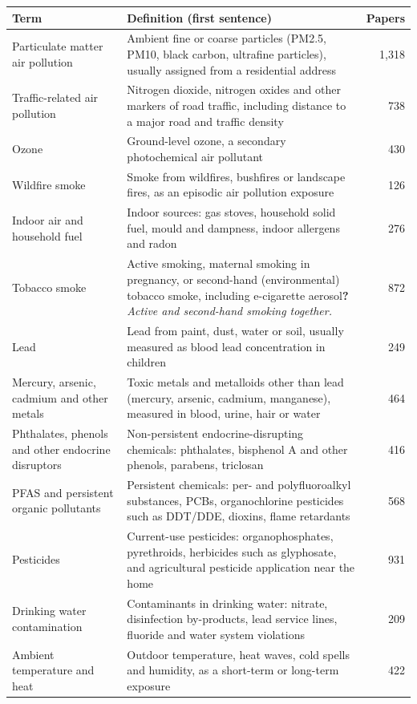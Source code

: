 \documentclass[10pt]{article}
\begin{document}
\begin{longtable}{@{}P{3.6cm}P{9.4cm}r@{}}\toprule Term & Definition (first sentence) & Papers\\\midrule\endhead
Particulate matter air pollution & Ambient fine or coarse particles (PM2.5, PM10, black carbon, ultrafine particles), usually assigned from a residential address & 1,318\\
Traffic-related air pollution & Nitrogen dioxide, nitrogen oxides and other markers of road traffic, including distance to a major road and traffic density & 738\\
Ozone & Ground-level ozone, a secondary photochemical air pollutant & 430\\
Wildfire smoke & Smoke from wildfires, bushfires or landscape fires, as an episodic air pollution exposure & 126\\
Indoor air and household fuel & Indoor sources: gas stoves, household solid fuel, mould and dampness, indoor allergens and radon & 276\\
Tobacco smoke & Active smoking, maternal smoking in pregnancy, or second-hand (environmental) tobacco smoke, including e-cigarette aerosol\newline\textbf{?} \emph{Active and second-hand smoking together.} & 872\\
Lead & Lead from paint, dust, water or soil, usually measured as blood lead concentration in children & 249\\
Mercury, arsenic, cadmium and other metals & Toxic metals and metalloids other than lead (mercury, arsenic, cadmium, manganese), measured in blood, urine, hair or water & 464\\
Phthalates, phenols and other endocrine disruptors & Non-persistent endocrine-disrupting chemicals: phthalates, bisphenol A and other phenols, parabens, triclosan & 416\\
PFAS and persistent organic pollutants & Persistent chemicals: per- and polyfluoroalkyl substances, PCBs, organochlorine pesticides such as DDT/DDE, dioxins, flame retardants & 568\\
Pesticides & Current-use pesticides: organophosphates, pyrethroids, herbicides such as glyphosate, and agricultural pesticide application near the home & 931\\
Drinking water contamination & Contaminants in drinking water: nitrate, disinfection by-products, lead service lines, fluoride and water system violations & 209\\
Ambient temperature and heat & Outdoor temperature, heat waves, cold spells and humidity, as a short-term or long-term exposure & 422\\

\end{longtable}
\end{document}
